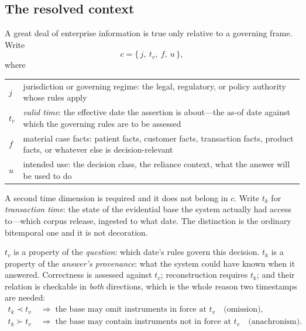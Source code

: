 \documentclass[11pt]{article}
\theoremstyle{plain}
\theoremstyle{definition}
\begin{document}
\subsection{The resolved context}
\label{sec:resolved-context}

A great deal of enterprise information is true only relative to a governing frame.
Write
\begin{equation}
  c = \{\, j,\ t_v,\ f,\ u \,\},
  \label{eq:context}
\end{equation}
where

\begin{center}
\begin{tabular}{@{}l>{\raggedright\arraybackslash}p{10.6cm}@{}}
\toprule
$j$ & jurisdiction or governing regime: the legal, regulatory, or policy authority
      whose rules apply \\
$t_v$ & \emph{valid time}: the effective date the assertion is about---the as-of date
      against which the governing rules are to be assessed \\
$f$ & material case facts: patient facts, customer facts, transaction facts,
      product facts, or whatever else is decision-relevant \\
$u$ & intended use: the decision class, the reliance context, what the answer will
      be used to do \\
\bottomrule
\end{tabular}
\end{center}

A second time dimension is required and it does not belong in $c$. Write $t_k$ for
\emph{transaction time}: the state of the evidential base the system actually had
access to---which corpus release, ingested to what date. The distinction is the
ordinary bitemporal one and it is not decoration.

$t_v$ is a property of the \emph{question}: which date's rules govern this decision.
$t_k$ is a property of the \emph{answer's provenance}: what the system could have
known when it answered. Correctness is assessed against $t_v$; reconstruction requires $t_k$; and their
relation is checkable in \emph{both} directions, which is the whole reason two
timestamps are needed:
\begin{align}
  t_k \prec t_v &\;\Longrightarrow\; \text{the base may omit instruments in force at }
    t_v \quad \text{(omission)}, \label{eq:bitemporal-stale}\\
  t_k \succ t_v &\;\Longrightarrow\; \text{the base may contain instruments not in
    force at } t_v \quad \text{(anachronism)}. \label{eq:bitemporal-anachronism}
\end{align}
\end{document}

